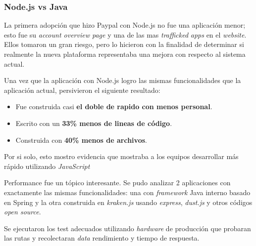 \subsubsection{Node.js vs Java \cite{online_nodejs_paypal}}



La primera adopción que hizo Paypal con Node.js no fue una aplicación menor; esto fue su \textit{account overview page} y una de las mas \textit{trafficked} \textit{apps} en el \textit{website}. Ellos tomaron un gran riesgo, pero lo hicieron con la finalidad de determinar si realmente la nueva plataforma representaba una mejora con respecto al sistema actual.

Una vez que la aplicación con Node.js logro las mismas funcionalidades que la aplicación actual, persivieron el siguiente resultado:

\begin{itemize}
\item Fue construida casi \textbf{el doble de rapido con menos personal}.
\item Escrito con un \textbf{33\% menos de lineas de código}.
\item Construida con \textbf{40\% menos de archivos}.
\end{itemize}

Por si solo, esto mostro evidencia que mostraba a los equipos desarrollar más rápido utilizando \textit{JavaScript}

Performance fue un tópico interesante. Se pudo analizar 2 aplicaciones con exactamente las mismas funcionalidades: una con \textit{framework} Java interno basado en Spring y la otra construida en \textit{kraken.js} usando \textit{express}, \textit{dust.js} y otros códigos \textit{open source}.

Se ejecutaron los test adecuados utilizando \textit{hardware} de producción que probaran las rutas y recolectaran \textit{data} rendimiento y tiempo de respuesta.

